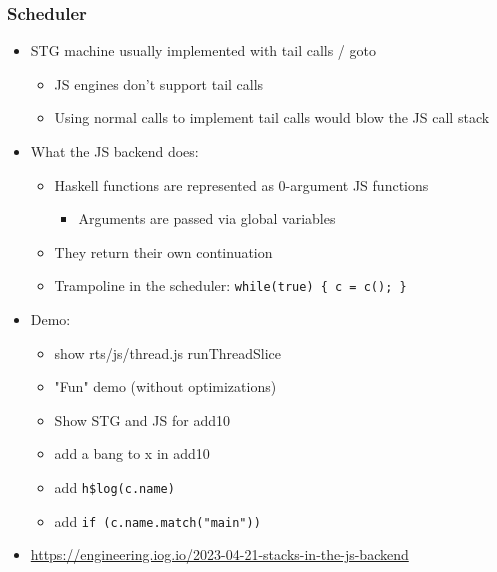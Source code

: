 \documentclass[aspectratio=169]{beamer}
\begin{document}
\begin{frame}
\frametitle{Scheduler}
  \begin{itemize}
    \item STG machine usually implemented with tail calls / goto
      \begin{itemize}
        \item JS engines don't support tail calls
        \item Using normal calls to implement tail calls would blow the JS call
          stack
      \end{itemize}

    \item What the JS backend does:
      \begin{itemize}
        \item Haskell functions are represented as 0-argument JS functions
          \begin{itemize}
            \item Arguments are passed via global variables
          \end{itemize}
        \item They \alert{return} their own continuation
        \item Trampoline in the scheduler: \texttt{while(true) \{ c = c(); \}}
      \end{itemize}
    \item Demo:
      \begin{itemize}
        \item show rts/js/thread.js runThreadSlice
        \item "Fun" demo (without optimizations)
        \item Show STG and JS for add10
        \item add a bang to x in add10
        \item add \texttt{h\$log(c.name)}
        \item add \texttt{if (c.name.match("main"))}
      \end{itemize}
        \item
          \url{https://engineering.iog.io/2023-04-21-stacks-in-the-js-backend}
  \end{itemize}
\end{frame}
\end{document}
